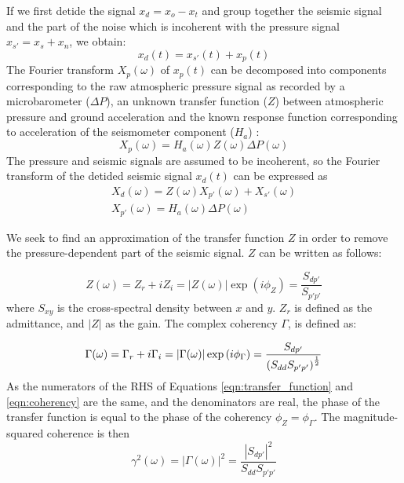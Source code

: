 If we first detide the signal $x_{d} = x_{o} - x_{t}$ and group together the seismic signal and the part of the noise which is incoherent with the pressure signal $x_{s'} = x_{s} + x_{n}$, we obtain:
\begin{equation}
  x_{d}(t) = x_{s'} (t) + x_{p} (t)
\end{equation}
\noindent The Fourier transform $X_p (\omega)$ of $x_p (t)$ can be decomposed into components corresponding to the raw atmospheric pressure signal as recorded by a microbarometer ($\Delta P$), an unknown transfer function ($Z$) between atmospheric pressure and ground acceleration and the known response function corresponding to acceleration of the seismometer component ($H_a$) \citep{Zurn2007}:
\begin{equation}
  X_{p} (\omega) = H_a (\omega) Z (\omega) \Delta P (\omega)
\end{equation}
\noindent The pressure and seismic signals are assumed to be incoherent, so the Fourier transform of the detided seismic signal $x_d (t)$ can be expressed as 
\begin{eqnarray}
  X_{d} (\omega) = Z (\omega) X_{p'} (\omega) + X_{s'} (\omega) \\
  X_{p'} (\omega)  = H_a (\omega) \Delta P (\omega) 
\end{eqnarray}

We seek to find an approximation of the transfer function $Z$ in order to remove the pressure-dependent part of the seismic signal. $Z$ can be written as follows:

\begin{equation}
  Z(\omega) = Z_r + iZ_i = \left| Z (\omega) \right| \exp \left( i\phi_Z \right) = \frac{S_{dp'}}{S_{p'p'}}
  \label{eqn:transfer_function}
\end{equation}
\noindent where $S_{xy}$ is the cross-spectral density between $x$ and $y$. $Z_r$ is defined as the admittance, and $\left| Z \right|$ as the gain. The complex coherency $\Gamma$, is defined as:

\begin{equation}
  \Gamma (\omega) = \Gamma_r + i\Gamma_i = \left| \Gamma (\omega) \right| \exp \left( i\phi_{\Gamma} \right)  = \frac{ S_{dp'} }{\left( S_{dd}  S_{p'p'} \right)^{1 \over 2} }
  \label{eqn:coherency}
\end{equation}
\noindent As the numerators of the RHS of Equations \ref{eqn:transfer_function} and \ref{eqn:coherency} are the same, and the denominators are real, the phase of the transfer function is equal to the phase of the coherency $\phi_{Z} = \phi_{\Gamma}$. The magnitude-squared coherence is then
\begin{equation}
  \gamma^2 (\omega) = \left| \Gamma (\omega) \right| ^2 = \frac{ \left| S_{dp'} \right|^2}{S_{dd}S_{p'p'}}
  \label{eqn:coherence}
\end{equation}



